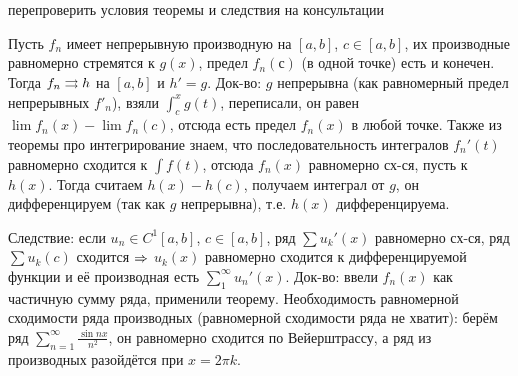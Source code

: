 \section{} %
\TODO перепроверить условия теоремы и следствия на консультации

Пусть $f_n$ имеет непрерывную производную на $[a,b]$, $c\in[a,b]$, их производные равномерно стремятся к $g(x)$, предел $f_n(с)$ (в одной точке) есть и конечен.
Тогда $f_n \rightrightarrows h$ на $[a,b]$ и $h'=g$.
Док-во: $g$ непрерывна (как равномерный предел непрерывных $f'_n$), взяли $\int_c^x g(t)$, переписали, он равен $\lim f_n(x) - \lim f_n(c)$, отсюда есть предел $f_n(x)$ в любой точке.
Также из теоремы про интегрирование знаем, что последовательность интегралов $f_n'(t)$ равномерно сходится к $\int f(t)$, отсюда $f_n(x)$ равномерно сх-ся,
пусть к $h(x)$.
Тогда считаем $h(x)-h(c)$, получаем интеграл от $g$, он дифференцируем (так как $g$ непрерывна), т.е. $h(x)$ дифференцируема.

Следствие: если $u_n \in C^1[a, b]$, $c\in[a,b]$, ряд $\sum u_k'(x)$ равномерно сх-ся, ряд $\sum u_k(c)$ сходится $\Rightarrow$ $u_k(x)$ равномерно сходится к дифференцируемой функции
и её производная есть $\sum_1^\infty u_n'(x)$.
Док-во: ввели $f_n(x)$ как частичную сумму ряда, применили теорему.
Необходимость равномерной сходимости ряда производных (равномерной сходимости ряда не хватит): берём ряд $\sum_{n=1}^\infty \frac{\sin nx}{n^2}$, он равномерно сходится по Вейерштрассу,
а ряд из производных разойдётся при $x=2\pi k$.
